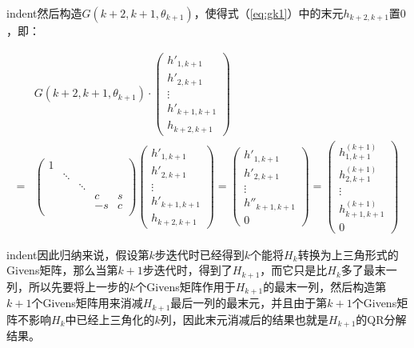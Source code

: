 \documentclass[UTF8,nofonts]{ctexart}
\begin{document}
indent然后构造$G(k+2,k+1,\theta_{k+1})$，使得式（\ref{eq:gk1}）中的末元$h_{k+2,k+1}$置$0$，即：

\begin{equation}
\label{eq:gk2}
\begin{aligned}
& G(k+2,k+1,\theta_{k+1}) \cdot
\begin{pmatrix}
	h'_{1,k+1} \\ h'_{2,k+1} \\ \vdots \\ h'_{k+1,k+1} \\ h_{k+2,k+1}
\end{pmatrix} \\ =&
\begin{pmatrix}
	1 & & & & \\
	& \ddots & & & \\
	& & \ddots & & \\
	& & & c & s \\
	& & & -s & c \\
\end{pmatrix}
\begin{pmatrix}
	h'_{1,k+1} \\ h'_{2,k+1} \\ \vdots \\ h'_{k+1,k+1} \\ h_{k+2,k+1}
\end{pmatrix} =
\begin{pmatrix}
	h'_{1,k+1} \\ h'_{2,k+1} \\ \vdots \\ h''_{k+1,k+1} \\ 0
\end{pmatrix} =
\begin{pmatrix}
	h^{(k+1)}_{1,k+1} \\ h^{(k+1)}_{2,k+1} \\ \vdots \\ h^{(k+1)}_{k+1,k+1} \\ 0
\end{pmatrix}
\end{aligned}
\end{equation}

indent因此归纳来说，假设第$k$步迭代时已经得到$k$个能将$H_k$转换为上三角形式的Givens矩阵，那么当第$k+1$步迭代时，得到了$H_{k+1}$，而它只是比$H_k$多了最末一列，所以先要将上一步的$k$个Givens矩阵作用于$H_{k+1}$的最末一列，然后构造第$k+1$个Givens矩阵用来消减$H_{k+1}$最后一列的最末元，并且由于第$k+1$个Givens矩阵不影响$H_k$中已经上三角化的$k$列，因此末元消减后的结果也就是$H_{k+1}$的QR分解结果。
\end{document}
